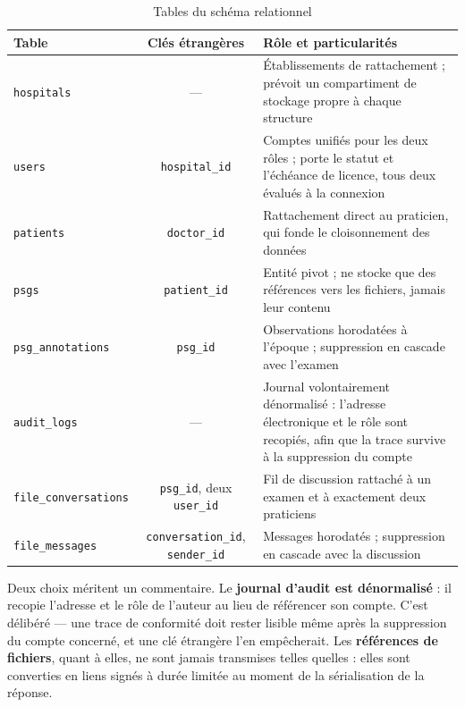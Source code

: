 \begin{table}[H]
\centering

\small
\begin{tabular}{@{}lcL{8.5cm}@{}}
\toprule
\textbf{Table} & \textbf{Clés étrangères} & \textbf{Rôle et particularités} \\
\midrule
\texttt{hospitals} & --- &
Établissements de rattachement ; prévoit un compartiment de stockage propre à chaque
structure \\
\addlinespace[2pt]
\texttt{users} & \texttt{hospital\_id} &
Comptes unifiés pour les deux rôles ; porte le statut et l'échéance de licence,
tous deux évalués à la connexion \\
\addlinespace[2pt]
\texttt{patients} & \texttt{doctor\_id} &
Rattachement direct au praticien, qui fonde le cloisonnement des données \\
\addlinespace[2pt]
\texttt{psgs} & \texttt{patient\_id} &
Entité pivot ; ne stocke que des références vers les fichiers, jamais leur contenu \\
\addlinespace[2pt]
\texttt{psg\_annotations} & \texttt{psg\_id} &
Observations horodatées à l'époque ; suppression en cascade avec l'examen \\
\addlinespace[2pt]
\texttt{audit\_logs} & --- &
Journal volontairement dénormalisé : l'adresse électronique et le rôle sont recopiés,
afin que la trace survive à la suppression du compte \\
\addlinespace[2pt]
\texttt{file\_conversations} & \texttt{psg\_id}, deux \texttt{user\_id} &
Fil de discussion rattaché à un examen et à exactement deux praticiens \\
\addlinespace[2pt]
\texttt{file\_messages} & \texttt{conversation\_id}, \texttt{sender\_id} &
Messages horodatés ; suppression en cascade avec la discussion \\
\bottomrule
\end{tabular}
\caption{Tables du schéma relationnel}
\label{tab:dico}
\end{table}

Deux choix méritent un commentaire. Le \textbf{journal d'audit est dénormalisé} : il
recopie l'adresse et le rôle de l'auteur au lieu de référencer son compte. C'est
délibéré --- une trace de conformité doit rester lisible même après la suppression du
compte concerné, et une clé étrangère l'en empêcherait. Les \textbf{références de
fichiers}, quant à elles, ne sont jamais transmises telles quelles : elles sont
converties en liens signés à durée limitée au moment de la sérialisation de la réponse.

